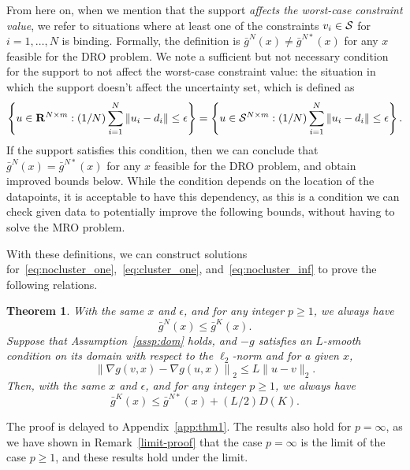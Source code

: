 \documentclass[12pt]{article}
\theoremstyle{thmstyleone}%
\newtheorem{theorem}{Theorem}%
\newtheorem{corollary}[theorem]{Corollary}%
\theoremstyle{thmstyletwo}%
\theoremstyle{thmstylethree}%
\newcommand{\reviewChanges}{}
\begin{document}
\reviewChanges{
From here on, when we mention that the support {\it affects the worst-case constraint value}, we refer to situations where at least one of the constraints $v_i \in \mathcal{S}$ for $i = 1,\dots,N$ is binding.
Formally, the definition is $\bar{g}^N(x) \neq \bar{g}^{N*}(x)$ for any $x$ feasible for the \gls{DRO} problem. 
We note a sufficient but not necessary condition for the support to not affect the worst-case constraint value: the situation in which the support doesn't affect the uncertainty set, which is defined as 
$$\left \{u \in {\mathbf R}^{N\times m}: (1/N)\sum_{i=1}^N  \| u_i - d_i \| \le \epsilon\right \} = \left \{ u \in \mathcal{S}^{N\times m}: (1/N)\sum_{i=1}^N \| u_i - d_i \| \le \epsilon\right \}.$$
If the support satisfies this condition, then we can conclude that $\bar{g}^N(x) = \bar{g}^{N*}(x)$ for any $x$ feasible for the \gls{DRO} problem, and obtain improved bounds below. 
While the condition depends on the location of the datapoints, it is acceptable to have this dependency, as this is a condition we can check given data to potentially improve the following bounds, without having to solve the MRO problem.}

With these definitions, we can construct solutions for~\eqref{eq:nocluster_one},~\eqref{eq:cluster_one}, and~\eqref{eq:nocluster_inf} to prove the following relations.
\begin{theorem}
	\label{thm:1}
	\reviewChanges{
	With the same $x$ and $\epsilon$, and for any integer $p \geq 1$, we always have $$\bar{g}^{N}(x) \le \bar{g}^K(x).$$
Suppose that Assumption~\ref{assp:dom} holds, and $-g$ satisfies an $L$-smooth condition on its domain with respect to the $\ell_2$-norm and for a given $x$,
	\begin{equation*}
		\left\|\nabla g(v,x) - \nabla g(u,x)\right\|_2 \leq L\| u - v\|_2.
	\end{equation*}
Then, with the same $x$ and $\epsilon$, and for any integer $p \geq 1$, we always have
	\begin{equation*}
	  \bar{g}^K(x) \leq \bar{g}^{N*}(x) + (L/2) D(K).
	\end{equation*}}
\end{theorem}
The proof is delayed to Appendix~\ref{app:thm1}. The results also hold for $p = \infty$, as we have shown in Remark~\ref{limit-proof} that the case $p = \infty$ is the limit of the case $p \geq 1$, and these results hold under the limit.
\end{document}
